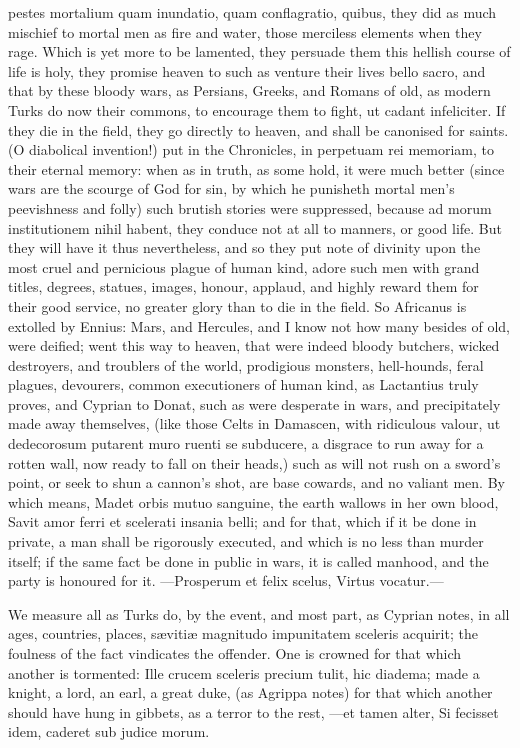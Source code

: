 {pestes mortalium quam inundatio, quam conflagratio, quibus, \etc{} they
did as much mischief to mortal men as fire and water, those merciless
elements when they rage. Which is yet more to be lamented, they
persuade them this hellish course of life is holy, they promise heaven
to such as venture their lives bello sacro, and that by these bloody
wars, as Persians, Greeks, and Romans of old, as modern Turks do now
their commons, to encourage them to fight, ut cadant infeliciter. If
they die in the field, they go directly to heaven, and shall be
canonised for saints. (O diabolical invention!) put in the Chronicles,
in perpetuam rei memoriam, to their eternal memory: when as in truth,
as some hold, it were much better (since wars are the scourge of
God for sin, by which he punisheth mortal men's peevishness and folly)
such brutish stories were suppressed, because ad morum institutionem
nihil habent, they conduce not at all to manners, or good life. But
they will have it thus nevertheless, and so they put note of
divinity upon the most cruel and pernicious plague of human kind,
adore such men with grand titles, degrees, statues, images,
honour, applaud, and highly reward them for their good service, no
greater glory than to die in the field. So Africanus is extolled by
Ennius: Mars, and Hercules, and I know not how many besides of
old, were deified; went this way to heaven, that were indeed bloody
butchers, wicked destroyers, and troublers of the world, prodigious
monsters, hell-hounds, feral plagues, devourers, common executioners of
human kind, as Lactantius truly proves, and Cyprian to Donat, such as
were desperate in wars, and precipitately made away themselves, (like
those Celts in Damascen, with ridiculous valour, ut dedecorosum
putarent muro ruenti se subducere, a disgrace to run away for a rotten
wall, now ready to fall on their heads,) such as will not rush on a
sword's point, or seek to shun a cannon's shot, are base cowards, and
no valiant men. By which means, Madet orbis mutuo sanguine, the earth
wallows in her own blood,
Savit amor ferri et scelerati insania belli; and for that, which
if it be done in private, a man shall be rigorously executed, and
which is no less than murder itself; if the same fact be done in public
in wars, it is called manhood, and the party is honoured for it.
---Prosperum et felix scelus,
Virtus vocatur.---

We measure all as Turks do, by the event, and most part, as Cyprian
notes, in all ages, countries, places, s\ae{}viti\ae{} magnitudo impunitatem
sceleris acquirit; the foulness of the fact vindicates the offender.
One is crowned for that which another is tormented: Ille crucem
sceleris precium tulit, hic diadema; made a knight, a lord, an earl, a
great duke, (as Agrippa notes) for that which another should have
hung in gibbets, as a terror to the rest,
---et tamen alter,
Si fecisset idem, caderet sub judice morum.

}
